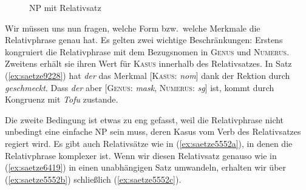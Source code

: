 

\begin{figure}[!htbp]
  \centering
  \vspace{0.3cm}
  \caption{NP mit Relativsatz}
  \label{fig:saetze9228}
\end{figure}


Wir müssen uns nun fragen, welche Form bzw.\ welche Merkmale die Relativphrase genau hat.
Es gelten zwei wichtige Beschränkungen:
Erstens kongruiert die Relativphrase mit dem Bezugsnomen in \textsc{Genus} und \textsc{Numerus}.
Zweitens erhält sie ihren Wert für \textsc{Kasus} innerhalb des Relativsatzes.
In Satz (\ref{ex:saetze9228}) hat \textit{der} das Merkmal [\textsc{Kasus}: \textit{nom}] dank der Rektion durch \textit{geschmeckt}.
Dass \textit{der} aber [\textsc{Genus}: \textit{mask}, \textsc{Numerus}: \textit{sg}] ist, kommt durch Kongruenz mit \textit{Tofu} zustande.

Die zweite Bedingung ist etwas zu eng gefasst, weil die Relativphrase nicht unbedingt eine einfache NP sein muss, deren Kasus vom Verb des Relativsatzes regiert wird.
Es gibt auch Relativsätze wie in (\ref{ex:saetze5552a}), in denen die Relativphrase komplexer ist.
Wenn wir diesen Relativsatz genauso wie in (\ref{ex:saetze6419}) in einen unabhängigen Satz umwandeln, erhalten wir über (\ref{ex:saetze5552b}) schließlich (\ref{ex:saetze5552c}).

\begin{exe}
  \ex\label{ex:saetze5552} 
    \begin{xlist}
    \end{xlist} 
\end{exe}

